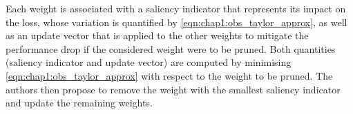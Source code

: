 \noindent Each weight is associated with a saliency indicator that represents
its impact on the loss, whose variation is quantified by
\cref{eqn:chap1:obs_taylor_approx}, as well as an update vector that is applied
to the other weights to mitigate the performance drop if the considered weight
were to be pruned. Both quantities (saliency indicator and update vector) are
computed by minimising \cref{eqn:chap1:obs_taylor_approx} with respect to the
weight to be pruned. The authors then propose to remove the weight with the
smallest saliency indicator and update the remaining weights.\\








